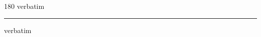 
\begin{frame}
\begin{center}
\begin{turn}{180}
{\fontsize{2.5cm}{1em}\selectfont verbatim}
\end{turn}
\vspace{1em}\par  
\hrule
\vspace{1em}\par  
{\fontsize{2.5cm}{1em}\selectfont verbatim}
\end{center}
\end{frame}
